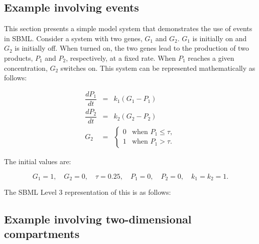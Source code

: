 

\subsection{Example involving events}
\label{sec:eventeg}

This section presents a simple model system that demonstrates the
use of events in SBML.  Consider a system with two genes,
$G_1$ and $G_2$.  $G_1$ is initially
on and $G_2$ is initially off.  When turned on, the two
genes lead to the production of two products, $P_1$ and $P_2$,
respectively, at a fixed rate.  When $P_1$ reaches a given
concentration, $G_2$ switches on.  This system can be
represented mathematically as follows:
\begin{linenomath}
\begin{eqnarray*}
  \dfrac{d P_1}{d t} & = & k_1 (G_1 - P_1)\\[3pt]
  \dfrac{d P_2}{d t} & = & k_2 (G_2 - P_2)\\
  G_2 & = &
    \begin{cases}
      0 & \text{when $P_1 \leq \tau$},\\
      1 & \text{when $P_1 > \tau$}.
    \end{cases}
\end{eqnarray*}
\end{linenomath}

The initial values are:
\begin{linenomath}
\begin{equation*}
  G_1 = 1, \quad G_2 = 0, \quad \tau = 0.25, \quad P_1 = 0, \quad P_2 = 0, \quad k_1 = k_2 = 1.
\end{equation*}
\end{linenomath}

The SBML Level 3 representation of this is as follows:



\subsection{Example involving two-dimensional compartments}
\label{sec:two-dimensional-eg}

